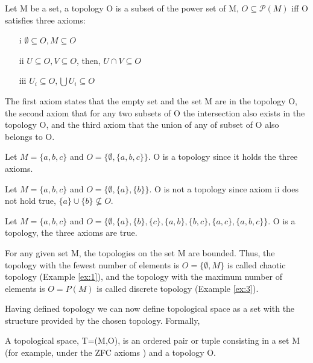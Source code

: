 \documentclass[onecollarge,runningheads]{svjour2}
\begin{document}
\begin{definition}
Let M be a set, a topology O is a subset of the power set of M, $O \subseteq \mathcal{P}(M)$ iff O  satisfies three axioms:
\begin{itemize}
\item[i] $\emptyset \subseteq O, M \subseteq O$
\item[ii] $U \subseteq  O, V \subseteq O$, then, $U \cap V \subseteq O$
\item[iii] $U_i \subseteq O, \bigcup  U_i \subseteq O$
\end{itemize}
\label{def:topology}
\end{definition}

The first axiom states that the empty set and the set M are in the topology O, the second axiom that for any two subsets of O the intersection also exists in the topology O, and the third axiom that the union of any of subset of O also belongs to O.

\begin{example}
Let $M = \{a,b,c\}$ and $O = \{\emptyset, \{a,b,c\}\}$. O is a topology since it holds the three axioms.
\label{ex:1}
\end{example}
\begin{example}
Let $M = \{a,b,c\}$ and $O = \{\emptyset, \{a\}, \{b\}\}$. O is not a topology since axiom ii does not hold true, $\{a\} \cup \{b\} \nsubseteq O$.
\label{ex:2}
\end{example}
\begin{example}
Let $M = \{a,b,c\}$ and $O = \{\emptyset, \{a\}, \{b\}, \{c\}, \{a,b\},\{b,c\},\{a,c\},\{a,b,c\}\}$. O is a topology, the three axioms are true.
\label{ex:3}
\end{example}
For any given set M, the topologies on the set M are bounded. Thus, the topology with the fewest number of elements is $O = \{\emptyset, M\}$ is called chaotic topology (Example \ref{ex:1}), and the topology with the maximum number of elements is $O = P(M)$ is called discrete topology (Example \ref{ex:3}).

Having defined topology we can now define topological space as a set with the structure provided by the chosen topology. Formally,
\begin{definition}
A topological space, T=(M,O), is an ordered pair or tuple consisting in a set M (for example, under the ZFC axioms \cite{suppes1960axiomatic}) and a topology O. %
 \end{definition}
\end{document}
